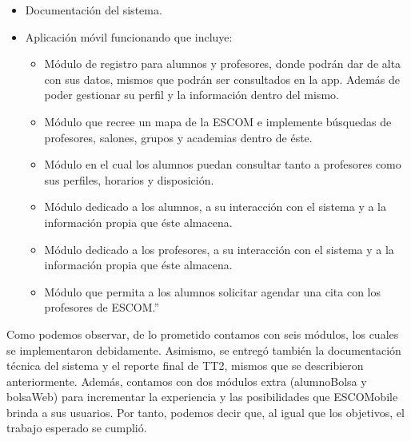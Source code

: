 \begin{itemize}
	\item Documentación del sistema.
	\item Aplicación móvil funcionando que incluye:
	\begin{itemize}
		\item Módulo de registro para alumnos y profesores, donde podrán dar de alta con sus datos, mismos que podrán ser consultados en la app. Además de poder gestionar su perfil y la información dentro del mismo. 
		\item Módulo que recree un mapa de la ESCOM e implemente búsquedas de profesores, salones, grupos y academias dentro de éste.
		\item Módulo en el cual los alumnos puedan consultar tanto a profesores como sus perfiles, horarios y disposición. 
		\item Módulo dedicado a los alumnos, a su interacción con el sistema y a la información propia que éste almacena.
		\item Módulo dedicado a los profesores, a su interacción con el sistema y a la información propia que éste almacena.
		\item Módulo que permita a los alumnos solicitar agendar una cita con los profesores de ESCOM.'' 
	\end{itemize}
\end{itemize}
Como podemos observar, de lo prometido contamos con seis módulos, los cuales se implementaron debidamente. Asimismo, se entregó también la documentación técnica del sistema y el reporte final de TT2, mismos que se describieron anteriormente. Además, contamos con dos módulos extra (alumnoBolsa y bolsaWeb) para incrementar la experiencia y las posibilidades que ESCOMobile brinda a sus usuarios. Por tanto, podemos decir que, al igual que los objetivos, el trabajo esperado se cumplió. 
 